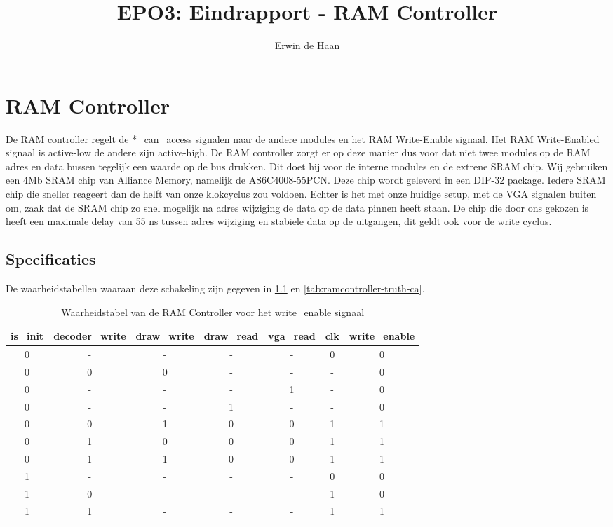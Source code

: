 \documentclass{scrreprt} %
\author{Erwin de Haan}%
\title{EPO3: Eindrapport - RAM Controller}
\begin{document}
\chapter{RAM Controller} %
\label{ch:ram-controller} %

De RAM controller regelt de *\_can\_access signalen naar de andere modules en het RAM Write-Enable signaal. Het RAM Write-Enabled signaal is active-low de andere zijn active-high. De RAM controller zorgt er op deze manier dus voor dat niet twee modules op de RAM adres en data bussen tegelijk een waarde op de bus drukken. Dit doet hij voor de interne modules en de extrene SRAM chip. Wij gebruiken een 4Mb SRAM chip van Alliance Memory, namelijk de AS6C4008-55PCN. Deze chip wordt geleverd in een DIP-32 package.
Iedere SRAM chip die sneller reageert dan de helft van onze klokcyclus zou voldoen. Echter is het met onze huidige setup, met de VGA signalen buiten om, zaak dat de SRAM chip zo snel mogelijk na adres wijziging de data op de data pinnen heeft staan.
De chip die door ons gekozen is heeft een maximale delay van 55 ns tussen adres wijziging en stabiele data op de uitgangen, dit geldt ook voor de write cyclus.



\section{Specificaties}
De waarheidstabellen waaraan deze schakeling zijn gegeven in \ref{tab:ramcontroller-truth-re} en \ref{tab:ramcontroller-truth-ca}.

\begin{table}[H]
\centering
\caption{Waarheidstabel van de RAM Controller voor het write\_enable signaal}
\label{tab:ramcontroller-truth-re}
\begin{tabular}{c c c c c c | c}
	\hline\hline
 	is\_init & decoder\_write & draw\_write & draw\_read & vga\_read & clk & write\_enable\\
 	\hline	
	0 & - & - & - & - & 0 & 0\\
	0 & 0 & 0 & - & - & - & 0\\
	0 & - & - & - & 1 & - & 0\\
	0 & - & - & 1 & - & - & 0\\
	0 & 0 & 1 & 0 & 0 & 1 & 1\\
	0 & 1 & 0 & 0 & 0 & 1 & 1\\
	0 & 1 & 1 & 0 & 0 & 1 & 1\\
	1 & - & - & - & - & 0 & 0\\
	1 & 0 & - & - & - & 1 & 0\\
	1 & 1 & - & - & - & 1 & 1\\
  	\hline
\end{tabular}
\end{table}
\end{document}
